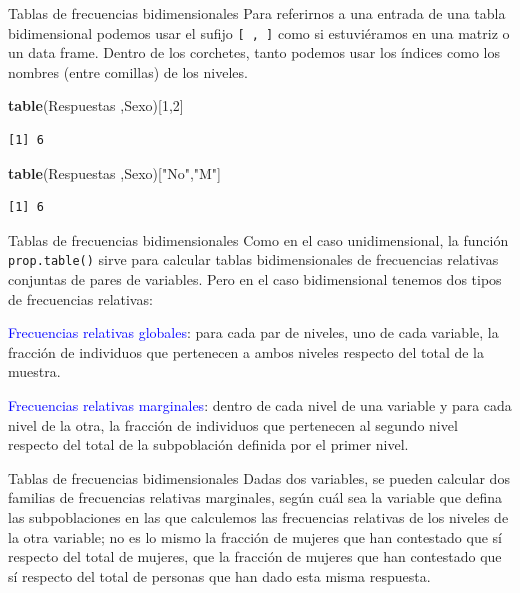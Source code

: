 \documentclass[
  ignorenonframetext,
  aspectratio=169]{beamer}
\newenvironment{Shaded}{\begin{snugshade}}{\end{snugshade}}
\newcommand{\DecValTok}[1]{\textcolor[rgb]{0.00,0.00,0.81}{#1}}
\newcommand{\FunctionTok}[1]{\textcolor[rgb]{0.13,0.29,0.53}{\textbf{#1}}}
\newcommand{\NormalTok}[1]{#1}
\newcommand{\StringTok}[1]{\textcolor[rgb]{0.31,0.60,0.02}{#1}}
\newcommand\blue[1]{\textcolor{blue}{#1}}
\begin{document}
\begin{frame}[fragile]{Tablas de frecuencias bidimensionales}
\label{tablas-de-frecuencias-bidimensionales-2}
Para referirnos a una entrada de una tabla bidimensional podemos usar el
sufijo \texttt{{[}\ ,\ {]}} como si estuviéramos en una matriz o un data
frame. Dentro de los corchetes, tanto podemos usar los índices como los
nombres (entre comillas) de los niveles.

\begin{Shaded}
\begin{Highlighting}[]
\FunctionTok{table}\NormalTok{(Respuestas ,Sexo)[}\DecValTok{1}\NormalTok{,}\DecValTok{2}\NormalTok{]}
\end{Highlighting}
\end{Shaded}

\begin{verbatim}
[1] 6
\end{verbatim}

\begin{Shaded}
\begin{Highlighting}[]
\FunctionTok{table}\NormalTok{(Respuestas ,Sexo)[}\StringTok{"No"}\NormalTok{,}\StringTok{"M"}\NormalTok{]}
\end{Highlighting}
\end{Shaded}

\begin{verbatim}
[1] 6
\end{verbatim}
\end{frame}

\begin{frame}[fragile]{Tablas de frecuencias bidimensionales}
\label{tablas-de-frecuencias-bidimensionales-3}
Como en el caso unidimensional, la función \texttt{prop.table()} sirve
para calcular tablas bidimensionales de frecuencias relativas conjuntas
de pares de variables. Pero en el caso bidimensional tenemos dos tipos
de frecuencias relativas:

\blue{Frecuencias relativas globales}: para cada par de niveles, uno de
cada variable, la fracción de individuos que pertenecen a ambos niveles
respecto del total de la muestra.

\blue{Frecuencias relativas marginales}: dentro de cada nivel de una
variable y para cada nivel de la otra, la fracción de individuos que
pertenecen al segundo nivel respecto del total de la subpoblación
definida por el primer nivel.
\end{frame}

\begin{frame}{Tablas de frecuencias bidimensionales}
\label{tablas-de-frecuencias-bidimensionales-4}
Dadas dos variables, se pueden calcular dos familias de frecuencias
relativas marginales, según cuál sea la variable que defina las
subpoblaciones en las que calculemos las frecuencias relativas de los
niveles de la otra variable; no es lo mismo la fracción de mujeres que
han contestado que sí respecto del total de mujeres, que la fracción de
mujeres que han contestado que sí respecto del total de personas que han
dado esta misma respuesta.
\end{frame}
\end{document}
